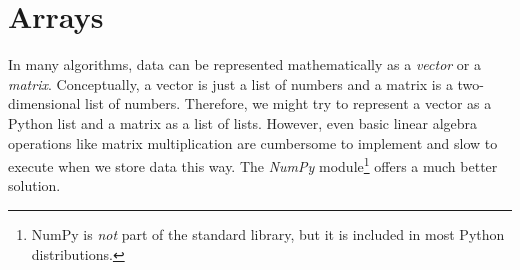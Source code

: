\label{lab:NumPyArrays}



\section*{Arrays} %

In many algorithms, data can be represented mathematically as a \emph{vector} or a \emph{matrix}.
Conceptually, a vector is just a list of numbers and a matrix is a two-dimensional list of numbers.
Therefore, we might try to represent a vector as a Python list and a matrix as a list of lists.
However, even basic linear algebra operations like matrix multiplication are cumbersome to implement and slow to execute when we store data this way.
The \emph{NumPy} module\footnote{NumPy is \emph{not} part of the standard library, but it is included in most Python distributions.} offers a much better solution.

